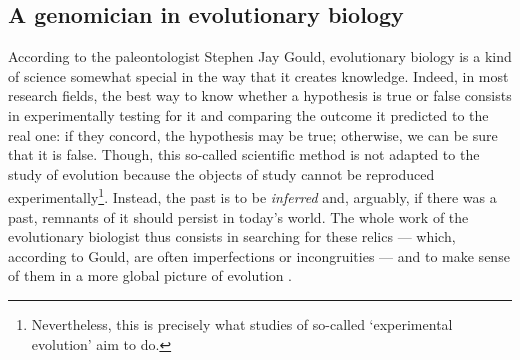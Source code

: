 %




\subsection{A genomician in evolutionary biology}

%


According to the paleontologist Stephen Jay Gould, evolutionary biology is a kind of science somewhat special in the way that it creates knowledge.
Indeed, in most research fields, the best way to know whether a hypothesis is true or false consists in experimentally testing for it and comparing the outcome it predicted to the real one: if they concord, the hypothesis may be true; otherwise, we can be sure that it is false.
Though, this so-called scientific method is not adapted to the study of evolution because the objects of study cannot be reproduced experimentally\footnote{Nevertheless, this is precisely what studies of so-called ‘experimental evolution’ aim to do.}.
Instead, the past is to be \textit{inferred} and, arguably, if there was a past, remnants of it should persist in today's world.
The whole work of the evolutionary biologist thus consists in searching for these relics — which, according to Gould, are often imperfections or incongruities — and to make sense of them in a more global picture of evolution \citep{gould1979turtles}.

